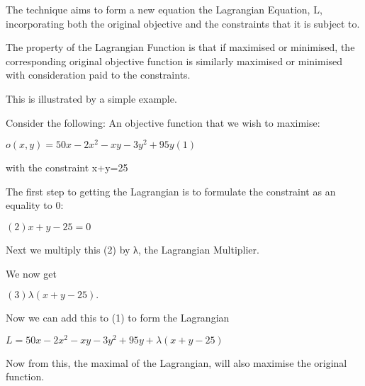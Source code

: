 \documentclass[12pt]{article}
\begin{document}
The technique aims to form a new equation the Lagrangian Equation, L, incorporating both the original objective and the constraints that it is subject to.

The property of the Lagrangian Function is that if maximised or minimised, the corresponding original objective function is similarly maximised or minimised with consideration paid to the constraints.

This is illustrated by a simple example.

Consider the following:
An objective function that we wish to maximise: 

$o(x,y)=50x-2x^2 -xy -3y^2 +95y (1)$

with the constraint
x+y=25

The first step to getting the Lagrangian is to formulate the constraint as an equality to 0:

$(2) x+y-25=0$

Next we multiply this (2) by λ, the Lagrangian Multiplier.

We now get 

$(3) λ(x+y-25).$

Now we can add this to (1) to form the Lagrangian

$L=50x-2x^2 -xy -3y^2 +95y+λ(x+y-25)$

Now from this, the maximal of the Lagrangian, will also maximise the original function.



\end{document}
